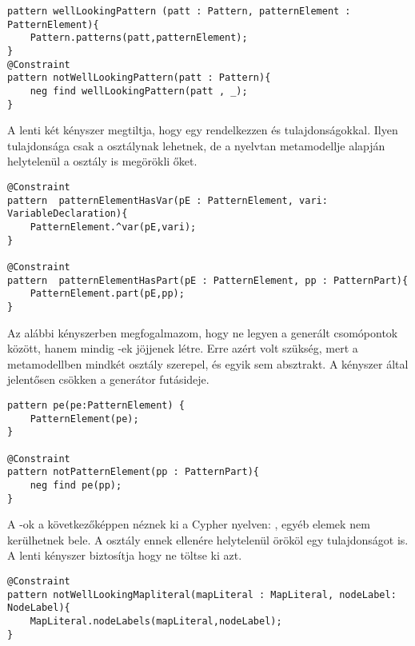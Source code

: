 \begin{lstlisting}[style=viatrasmall]
pattern wellLookingPattern (patt : Pattern, patternElement : PatternElement){
	Pattern.patterns(patt,patternElement);
}
@Constraint 
pattern notWellLookingPattern(patt : Pattern){
	neg find wellLookingPattern(patt , _);
}
\end{lstlisting}


A lenti két kényszer megtiltja, hogy egy  rendelkezzen  és   tulajdonságokkal. Ilyen tulajdonsága csak a  osztálynak lehetnek, de a nyelvtan metamodellje alapján helytelenül a  osztály is megörökli őket. 

\begin{lstlisting}[style=viatrasmall]
@Constraint
pattern  patternElementHasVar(pE : PatternElement, vari: VariableDeclaration){
	PatternElement.^var(pE,vari);
}

@Constraint
pattern  patternElementHasPart(pE : PatternElement, pp : PatternPart){
	PatternElement.part(pE,pp);
}
\end{lstlisting}

Az alábbi kényszerben megfogalmazom, hogy ne legyen  a generált csomópontok között, hanem mindig -ek jöjjenek létre. Erre azért volt szükség, mert a metamodellben mindkét osztály szerepel, és egyik sem absztrakt. A kényszer által jelentősen csökken a generátor futásideje.

\begin{lstlisting}[style=viatrasmall]
pattern pe(pe:PatternElement) {
	PatternElement(pe);
}

@Constraint
pattern notPatternElement(pp : PatternPart){
	neg find pe(pp);
}
\end{lstlisting}


A -ok a következőképpen néznek  ki a Cypher nyelven: , egyéb elemek nem kerülhetnek bele. A  osztály ennek ellenére helytelenül örököl egy  tulajdonságot is. A lenti kényszer biztosítja hogy ne töltse ki azt.

\begin{lstlisting}[style=viatrasmall]
@Constraint
pattern notWellLookingMapliteral(mapLiteral : MapLiteral, nodeLabel: NodeLabel){
	MapLiteral.nodeLabels(mapLiteral,nodeLabel);
}

\end{lstlisting}

